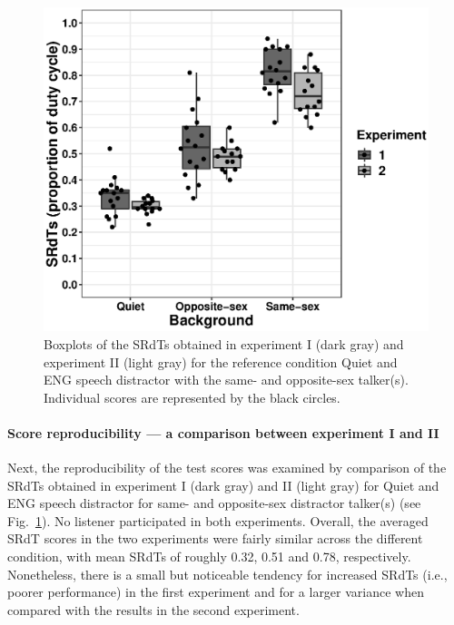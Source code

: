 \documentclass[a4paper, twoside]{templates/ociamthesis}
\begin{document}
\begin{figure}[ht]
\center
\includegraphics[width=\textwidth]{figures/Chapt1/Boxplot_SK_vs_HW.eps}
\caption{\label{fig:Cmpr_Exp1_2}{Boxplots of the SRdTs obtained in experiment I (dark gray) and experiment II (light gray) for the reference condition Quiet and ENG speech distractor with the same- and opposite-sex talker(s). Individual scores are represented by the black circles.}}
\end{figure}

\hypertarget{score-reproducibility-a-comparison-between-experiment-i-and-ii}{%
\paragraph{Score reproducibility --- a comparison between experiment I and II}\label{score-reproducibility-a-comparison-between-experiment-i-and-ii}}

Next, the reproducibility of the test scores was examined by comparison of the SRdTs obtained in experiment I (dark gray) and II (light gray) for Quiet and ENG speech distractor for same- and opposite-sex distractor talker(s) (see Fig.~\ref{fig:Cmpr_Exp1_2}). No listener participated in both experiments. Overall, the averaged SRdT scores in the two experiments were fairly similar across the different condition, with mean SRdTs of roughly 0.32, 0.51 and 0.78, respectively. Nonetheless, there is a small but noticeable tendency for increased SRdTs (i.e., poorer performance) in the first experiment and for a larger variance when compared with the results in the second experiment.\\
\end{document}

